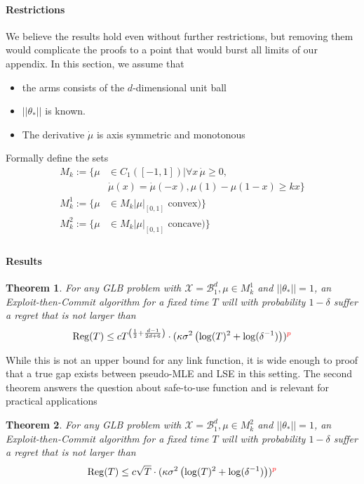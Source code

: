 \documentclass[twoside]{article} \usepackage{aistats2017}
\newtheorem{theorem}{Theorem}
\begin{document}
\paragraph{Restrictions}
We believe the results hold even without further restrictions, but removing them would complicate the proofs to a point that would burst all limits of our appendix.
In this section, we assume that
\begin{itemize}
\item the arms consists of the $d$-dimensional unit ball
\item $||\theta_*||$ is known.
\item The derivative $\dot{\mu}$ is axis symmetric and monotonous
\end{itemize}
Formally define the sets
\begin{align*}
M_k := \{\mu &\in C_1([-1,1]) | \forall x \,\dot{\mu}\geq0,\\
&\dot{\mu}(x) = \dot{\mu}(-x), \mu(1)-\mu(1-x)\geq k x\}\\
M_k^1 := \{\mu &\in M_k | \mu|_{[0,1]} \mbox{ convex})\}\\
M_k^2 := \{\mu &\in M_k | \mu|_{[0,1]} \mbox{ concave})\}
\end{align*}
\begin{align*}
\end{align*}
\paragraph{Results} 
\begin{theorem}
For any GLB problem with $\mathcal{X}=\mathcal{B}^{d}_1, \mu\in M_k^1$ and $||\theta_*||=1$, an Exploit-then-Commit algorithm for a fixed time $T$ will with probability $1-\delta$ suffer a regret that is not larger than 
$$
\operatorname{Reg}(T) \leq c T^{\left(\frac{1}{2}+\frac{d-1}{2d+6}\right)}\cdot(\kappa\sigma^2\left(\log(T)^2+\log(\delta^{-1})\right))\color{red}^p\color{black}
$$
\end{theorem}
While this is not an upper bound for any link function, it is wide enough to proof that a true gap exists between pseudo-MLE and LSE in this setting. The second theorem answers the question about safe-to-use function and is relevant for practical applications
\begin{theorem}
For any GLB problem with $\mathcal{X}=\mathcal{B}^{d}_1, \mu\in M_k^2$ and $||\theta_*||=1$, an Exploit-then-Commit algorithm for a fixed time $T$ will with probability $1-\delta$ suffer a regret that is not larger than
$$
\operatorname{Reg}(T) \leq c \sqrt{T}\cdot(\kappa\sigma^2\left(\log(T)^2+\log(\delta^{-1})\right))\color{red}^p\color{black}
$$
\end{theorem}
\end{document}
